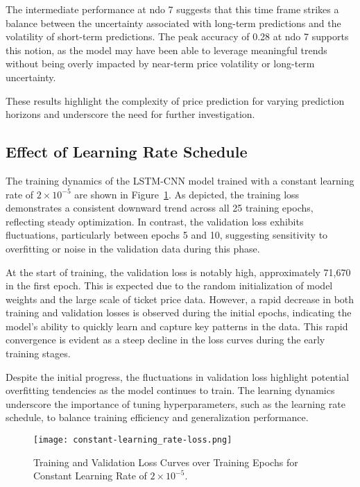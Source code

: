 \documentclass[conference]{IEEEtran}
\begin{document}
The intermediate performance at ndo 7 suggests that this time frame strikes a balance between the uncertainty associated with long-term predictions and the volatility of short-term predictions. The peak accuracy of 0.28 at ndo 7 supports this notion, as the model may have been able to leverage meaningful trends without being overly impacted by near-term price volatility or long-term uncertainty.

These results highlight the complexity of price prediction for varying prediction horizons and underscore the need for further investigation. 

\subsection{Effect of Learning Rate Schedule}
The training dynamics of the LSTM-CNN model trained with a constant learning rate of $2 \times 10^{-5}$ are shown in Figure~\ref{fig:constant_lr-loss-curve}. As depicted, the training loss demonstrates a consistent downward trend across all 25 training epochs, reflecting steady optimization. In contrast, the validation loss exhibits fluctuations, particularly between epochs 5 and 10, suggesting sensitivity to overfitting or noise in the validation data during this phase.

At the start of training, the validation loss is notably high, approximately 71,670 in the first epoch. This is expected due to the random initialization of model weights and the large scale of ticket price data. However, a rapid decrease in both training and validation losses is observed during the initial epochs, indicating the model’s ability to quickly learn and capture key patterns in the data. This rapid convergence is evident as a steep decline in the loss curves during the early training stages.

Despite the initial progress, the fluctuations in validation loss highlight potential overfitting tendencies as the model continues to train. The learning dynamics underscore the importance of tuning hyperparameters, such as the learning rate schedule, to balance training efficiency and generalization performance.


\begin{figure}[htbp]
    \centering
    \texttt{[image: constant-learning\_rate-loss.png]}
    \caption{Training and Validation Loss Curves over Training Epochs for Constant Learning Rate of $2 \times 10^{-5}$.}
    \label{fig:constant_lr-loss-curve}
\end{figure}
\end{document}
